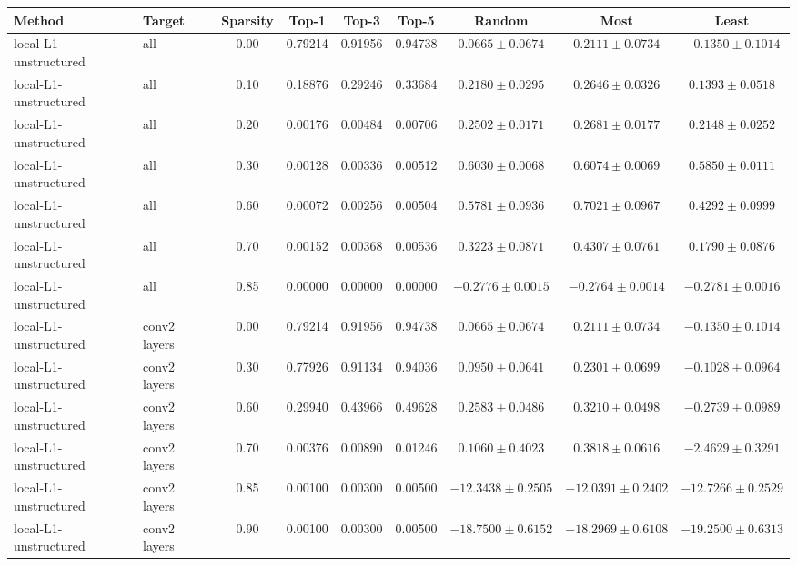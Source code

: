 \begin{table}[!htb]
\centering
\footnotesize
\begin{tabular}{l l c c c c c c c}
\toprule
\textbf{Method} & \textbf{Target} & \textbf{Sparsity} & \textbf{Top-1} & \textbf{Top-3} & \textbf{Top-5} & \textbf{Random} & \textbf{Most} & \textbf{Least} \\
\midrule
local-L1-unstructured & all & 0.00 & 0.79214 & 0.91956 & 0.94738 & $0.0665\pm0.0674$ & $0.2111\pm0.0734$ & $-0.1350\pm0.1014$ \\
local-L1-unstructured & all & 0.10 & 0.18876 & 0.29246 & 0.33684 & $0.2180\pm0.0295$ & $0.2646\pm0.0326$ & $0.1393\pm0.0518$ \\
local-L1-unstructured & all & 0.20 & 0.00176 & 0.00484 & 0.00706 & $0.2502\pm0.0171$ & $0.2681\pm0.0177$ & $0.2148\pm0.0252$ \\
local-L1-unstructured & all & 0.30 & 0.00128 & 0.00336 & 0.00512 & $0.6030\pm0.0068$ & $0.6074\pm0.0069$ & $0.5850\pm0.0111$ \\
local-L1-unstructured & all & 0.60 & 0.00072 & 0.00256 & 0.00504 & $0.5781\pm0.0936$ & $0.7021\pm0.0967$ & $0.4292\pm0.0999$ \\
local-L1-unstructured & all & 0.70 & 0.00152 & 0.00368 & 0.00536 & $0.3223\pm0.0871$ & $0.4307\pm0.0761$ & $0.1790\pm0.0876$ \\
local-L1-unstructured & all & 0.85 & 0.00000 & 0.00000 & 0.00000 & $-0.2776\pm0.0015$ & $-0.2764\pm0.0014$ & $-0.2781\pm0.0016$ \\
\midrule
local-L1-unstructured & conv2 layers & 0.00 & 0.79214 & 0.91956 & 0.94738 & $0.0665\pm0.0674$ & $0.2111\pm0.0734$ & $-0.1350\pm0.1014$ \\
local-L1-unstructured & conv2 layers & 0.30 & 0.77926 & 0.91134 & 0.94036 & $0.0950\pm0.0641$ & $0.2301\pm0.0699$ & $-0.1028\pm0.0964$ \\
local-L1-unstructured & conv2 layers & 0.60 & 0.29940 & 0.43966 & 0.49628 & $0.2583\pm0.0486$ & $0.3210\pm0.0498$ & $-0.2739\pm0.0989$ \\
local-L1-unstructured & conv2 layers & 0.70 & 0.00376 & 0.00890 & 0.01246 & $0.1060\pm0.4023$ & $0.3818\pm0.0616$ & $-2.4629\pm0.3291$ \\
local-L1-unstructured & conv2 layers & 0.85 & 0.00100 & 0.00300 & 0.00500 & $-12.3438\pm0.2505$ & $-12.0391\pm0.2402$ & $-12.7266\pm0.2529$ \\
local-L1-unstructured & conv2 layers & 0.90 & 0.00100 & 0.00300 & 0.00500 & $-18.7500\pm0.6152$ & $-18.2969\pm0.6108$ & $-19.2500\pm0.6313$ \\

\end{tabular}
\end{table}
